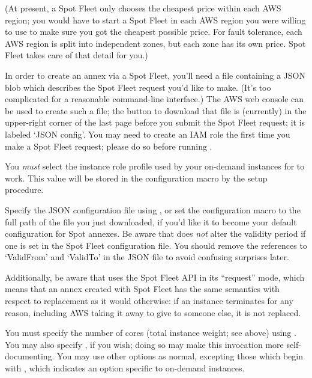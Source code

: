 (At present, a Spot Fleet only chooses the cheapest price within each
AWS region; you would have to start a Spot Fleet in each AWS region you
were willing to use to make sure you got the cheapest possible price.  For
fault tolerance, each AWS region is split into independent zones, but each
zone has its own price.  Spot Fleet takes care of that detail for you.)

In order to create an annex via a Spot Fleet, you'll need a file containing
a JSON blob which describes the Spot Fleet request you'd like to make.  (It's
too complicated for a reasonable command-line interface.)  The AWS web
console can be used to create such a file; the button to download that
file is (currently) in the upper-right corner of the last page before
you submit the Spot Fleet request; it is labeled `JSON config'.  You
may need to create an IAM role the first time you make a Spot Fleet
request; please do so before running .

You \emph{must} select the instance role profile used by your on-demand
instances for  to work.  This value will be stored in the
configuration macro 
by the setup procedure.


Specify the JSON configuration file using ,
or set the configuration macro  to
the full path of the file you just downloaded, if you'd like it to become
your default configuration for Spot annexes.  Be aware that 
does \emph{not} alter the validity period if one is set in the Spot
Fleet configuration file.  You should remove the references to `ValidFrom'
and `ValidTo' in the JSON file to avoid confusing surprises later.

Additionally, be aware that  uses the Spot Fleet API in
its ``request'' mode, which means that an annex created with Spot
Fleet has the same semantics with respect to replacement as it would
otherwise: if an instance terminates for any reason, including AWS
taking it away to give to someone else, it is not replaced.

You must specify the number of cores (total instance weight; see above) using
.  You may also specify , if you wish;
doing so may make this  invocation more self-documenting.
You may use other options as normal, excepting those which begin with
, which indicates an option specific to on-demand
instances.

